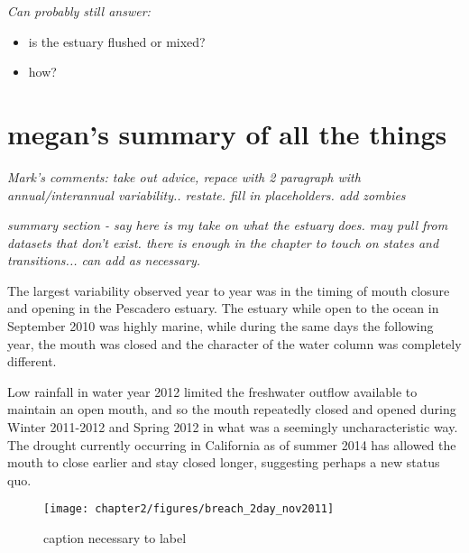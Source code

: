 \emph{Can probably still answer:}
\begin{itemize} 
	\item is the estuary flushed or mixed?
	\item how?
\end{itemize}

	










\section{megan's summary of all the things} \label{backofch2}

\emph{Mark's comments: take out advice, repace with 2 paragraph with annual/interannual variability.. restate. fill in placeholders. add zombies}

\emph{summary section - say here is my take on what the estuary does.  may pull from datasets that don't exist.  there is enough in the chapter to touch on states and transitions... can add as necessary.}

The largest variability observed year to year was in the timing of mouth closure and opening in the Pescadero estuary. The estuary while open to the ocean in September 2010 was highly marine, while during the same days the following year, the mouth was closed and the character of the water column was completely different. 

Low rainfall in water year 2012 limited the freshwater outflow available to maintain an open mouth, and so the mouth repeatedly closed and opened during Winter 2011-2012 and Spring 2012 in what was a seemingly uncharacteristic way. The drought currently occurring in California as of summer 2014 has allowed the mouth to close earlier and stay closed longer, suggesting perhaps a new status quo. 












\begin{figure}[tbh]
	\texttt{[image: chapter2/figures/breach\_2day\_nov2011]} \caption{caption necessary to label} \label{fig:ctdBreachNov11}
\end{figure}


